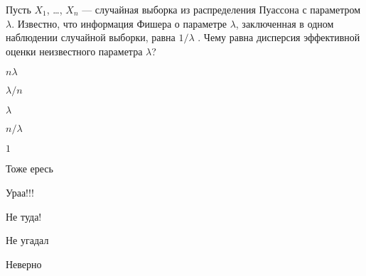 
\begin{question}
Пусть \(X_1\), \ldots, \(X_n\) — случайная выборка из распределения
Пуассона с параметром \(\lambda\). Известно, что информация Фишера о
параметре \(\lambda\), заключенная в одном наблюдении случайной выборки,
равна \(1/\lambda\) . Чему равна дисперсия эффективной оценки
неизвестного параметра \(\lambda\)?
\begin{answerlist}
  \item \(n\lambda\)
  \item \(\lambda/n\)
  \item \(\lambda\)
  \item \(n/\lambda\)
  \item \(1\)
\end{answerlist}
\end{question}

\begin{solution}
\begin{answerlist}
  \item Тоже ересь
  \item Ураа!!!
  \item Не туда!
  \item Не угадал
  \item Неверно
\end{answerlist}
\end{solution}

